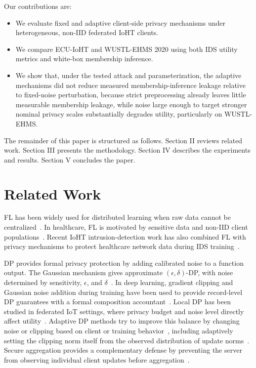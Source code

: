 \documentclass[conference]{IEEEtran}
\begin{document}
Our contributions are:
\begin{itemize}
    \item We evaluate fixed and adaptive client-side privacy mechanisms under
    heterogeneous, non-IID federated IoHT clients.
    \item We compare ECU-IoHT and WUSTL-EHMS 2020 using both IDS utility metrics
    and white-box membership inference.
    \item We show that, under the tested attack and parameterization, the
    adaptive mechanisms did not reduce measured membership-inference leakage
    relative to fixed-noise perturbation, because strict preprocessing already
    leaves little measurable membership leakage, while noise large enough to
    target stronger nominal privacy scales substantially degrades utility,
    particularly on WUSTL-EHMS.
\end{itemize}

The remainder of this paper is structured as follows. Section II reviews related
work. Section III presents the methodology. Section IV describes the experiments
and results. Section V concludes the paper.

\section{Related Work}

FL has been widely used for distributed learning when raw data cannot be
centralized~\cite{mcmahan2017communication}. In healthcare, FL is motivated by
sensitive data and non-IID client populations~\cite{prayitno2021healthcarefl}.
Recent IoHT intrusion-detection work has also combined FL with privacy
mechanisms to protect healthcare network data during IDS
training~\cite{mosaiyebzadeh2025secioht}.

DP provides formal privacy protection by adding calibrated noise to a function
output. The Gaussian mechanism gives approximate \((\epsilon,\delta)\)-DP, with
noise determined by sensitivity, \(\epsilon\), and
\(\delta\)~\cite{dwork2006ourdata,dwork2014algorithmic}. In deep learning,
gradient clipping and Gaussian noise addition during training have been used to
provide record-level DP guarantees with a formal composition
accountant~\cite{abadi2016deep}. Local DP has been studied in federated IoT
settings, where privacy budget and noise level directly affect
utility~\cite{zhao2021ldpfl}. Adaptive DP methods try to improve this balance by
changing noise or clipping based on client or training
behavior~\cite{yue2025adapldpfl,he2024clustered,talaei2024adaptive}, including
adaptively setting the clipping norm itself from the observed distribution of
update norms~\cite{andrew2021adaptive}. Secure aggregation provides a
complementary defense by preventing the server from observing individual client
updates before aggregation~\cite{bonawitz2017practical}.
\end{document}
